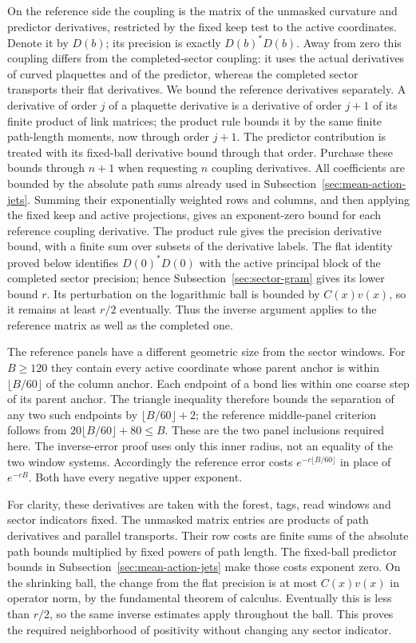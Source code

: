 On the reference side the coupling is the matrix of the
unmasked curvature and predictor derivatives, restricted by the
fixed keep test to the active coordinates. Denote it by $D(b)$;
its precision is exactly $D(b)^*D(b)$. Away from zero this
coupling differs from the completed-sector coupling: it uses the
actual derivatives of curved plaquettes and of the predictor,
whereas the completed sector transports their flat derivatives.
We bound the reference derivatives separately. A derivative of
order $j$ of a plaquette derivative is a derivative of order
$j+1$ of its finite product of link matrices; the product rule
bounds it by the same finite path-length moments, now through
order $j+1$. The predictor contribution is treated with its
fixed-ball derivative bound through that order. Purchase these
bounds through $n+1$ when requesting $n$ coupling derivatives.
All coefficients are bounded by the absolute path sums already
used in Subsection~\ref{sec:mean-action-jets}. Summing their
exponentially weighted rows and columns, and then applying the
fixed keep and active projections, gives an exponent-zero bound
for each reference coupling derivative. The product rule gives
the precision derivative bound, with a finite sum over subsets
of the derivative labels.
The flat identity proved below identifies $D(0)^*D(0)$ with the
active principal block of the completed sector precision; hence
Subsection~\ref{sec:sector-gram} gives its lower bound $r$.
Its perturbation on the logarithmic ball is bounded by $C(x)v(x)$,
so it remains at least $r/2$ eventually. Thus the inverse argument
applies to the reference matrix as well as the completed one.

The reference panels have a different geometric size from the
sector windows. For $B\ge120$ they contain every active coordinate
whose parent anchor is within $\lfloor B/60\rfloor$ of the column
anchor. Each endpoint of a bond lies within one coarse step of
its parent anchor. The triangle inequality therefore bounds the
separation of any two such endpoints by $\lfloor B/60\rfloor+2$;
the reference middle-panel criterion follows from
$20\lfloor B/60\rfloor+80\le B$. These are the two panel
inclusions required here. The inverse-error proof uses only
this inner radius, not an equality of the two window systems.
Accordingly the reference error costs
$e^{-c\lfloor B/60\rfloor}$ in place of $e^{-cB}$.
Both have every negative upper exponent.

For clarity, these derivatives are taken with the forest, tags,
read windows and sector indicators fixed. The unmasked matrix
entries are products of path derivatives and parallel transports.
Their row costs are finite sums of the absolute path bounds
multiplied by fixed powers of path length. The fixed-ball
predictor bounds in Subsection~\ref{sec:mean-action-jets} make those
costs exponent zero. On the shrinking ball, the change from the
flat precision is at most $C(x)v(x)$ in operator norm, by the
fundamental theorem of calculus. Eventually this is less than
$r/2$, so the same inverse estimates apply throughout the ball.
This proves the required neighborhood of positivity without
changing any sector indicator.


